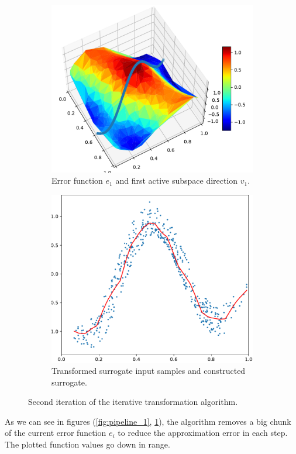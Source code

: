 \documentclass[
  a4paper,  %
  twoside,  %
  bibliography=totoc,
  headsepline,
  cleardoublepage=empty,
  parskip=half,
  draft=false
]{scrbook}
\begin{document}
\begin{figure}[H]
\begin{subfigure}{.45\textwidth}
  \centering
  \includegraphics[width=.8\linewidth]{graphics/pipeline_current_2}
  \caption{Error function $e_1$ and first active subspace direction $v_1$.}
\end{subfigure}%
\hspace{0.07\textwidth}
\begin{subfigure}{.45\textwidth}
  \centering
  \includegraphics[width=.8\linewidth]{graphics/pipeline_local_2}
  \caption{Transformed surrogate input samples and constructed surrogate.}
\end{subfigure}
\caption{Second iteration of the iterative transformation algorithm.}
\label{fig:pipeline_2}
\end{figure}

As we can see in figures (\cref{fig:pipeline_1}, \cref{fig:pipeline_2}), the algorithm removes a big chunk of the current error function $e_i$ to reduce the approximation error in each step.
The plotted function values go down in range.
\end{document}
